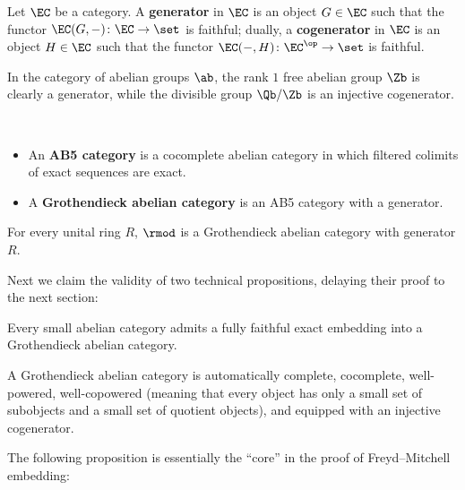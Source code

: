 \documentclass[twoside]{article}
\begin{document}
\begin{defn}
Let $\EC$ be a category. A \textbf{generator} in $\EC$ is an object $G \in \EC$ such that the functor $\EC(G, -)\colon \EC \rightarrow \set$ is faithful; dually, a \textbf{cogenerator} in $\EC$ is an object $H \in \EC$ such that the functor $\EC(-, H)\colon \EC^\op \rightarrow \set$ is faithful.
\end{defn}

\begin{expl}
In the category of abelian groups $\ab$, the rank $1$ free abelian group $\Zb$ is clearly a generator, while the divisible group $\Qb/\Zb$ is an injective cogenerator.
\end{expl}

\begin{defn}
\ 
\begin{itemize}
\item An \textbf{AB5 category} is a cocomplete abelian category in which filtered colimits of exact sequences are exact.
\item A \textbf{Grothendieck abelian category} is an AB5 category with a generator.
\end{itemize}
\end{defn}

\begin{expl}
For every unital ring $R$, $\rmod$ is a Grothendieck abelian category with generator $R$.
\end{expl}

Next we claim the validity of two technical propositions, delaying their proof to the next section:

\begin{prop}\label{preone}
Every small abelian category admits a fully faithful exact embedding into a Grothendieck abelian category.
\end{prop}

\begin{prop}\label{pretwo}
A Grothendieck abelian category is automatically complete, cocomplete, well-powered, well-copowered (meaning that every object has only a small set of subobjects and a small set of quotient objects), and equipped with an injective cogenerator.
\end{prop}

The following proposition is essentially the ``core'' in the proof of Freyd--Mitchell embedding:
\end{document}
